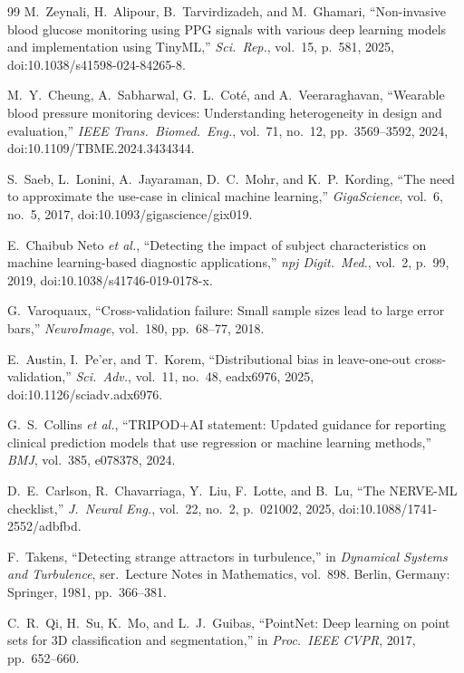\documentclass[journal]{IEEEtran}
\begin{document}
\begin{thebibliography}{99}
M.~Zeynali, H.~Alipour, B.~Tarvirdizadeh, and M.~Ghamari, ``Non-invasive
blood glucose monitoring using PPG signals with various deep learning models
and implementation using TinyML,'' \emph{Sci.\ Rep.}, vol.~15, p.~581, 2025,
doi:10.1038/s41598-024-84265-8.

M.~Y.~Cheung, A.~Sabharwal, G.~L.~Cot\'e, and A.~Veeraraghavan, ``Wearable
blood pressure monitoring devices: Understanding heterogeneity in design and
evaluation,'' \emph{IEEE Trans.\ Biomed.\ Eng.}, vol.~71,
no.~12, pp.~3569--3592, 2024, doi:10.1109/TBME.2024.3434344.

S.~Saeb, L.~Lonini, A.~Jayaraman, D.~C.~Mohr, and K.~P.~Kording, ``The need
to approximate the use-case in clinical machine learning,''
\emph{GigaScience}, vol.~6, no.~5, 2017, doi:10.1093/gigascience/gix019.

E.~Chaibub Neto \emph{et al.}, ``Detecting the impact of subject
characteristics on machine learning-based diagnostic applications,''
\emph{npj Digit.\ Med.}, vol.~2, p.~99, 2019, doi:10.1038/s41746-019-0178-x.

G.~Varoquaux, ``Cross-validation failure: Small sample sizes lead to large
error bars,'' \emph{NeuroImage}, vol.~180, pp.~68--77, 2018.

E.~Austin, I.~Pe'er, and T.~Korem, ``Distributional bias in leave-one-out
cross-validation,'' \emph{Sci.\ Adv.}, vol.~11, no.~48, eadx6976, 2025,
doi:10.1126/sciadv.adx6976.

G.~S.~Collins \emph{et al.}, ``TRIPOD+AI statement: Updated guidance for
reporting clinical prediction models that use regression or machine
learning methods,'' \emph{BMJ}, vol.~385, e078378, 2024.

D.~E.~Carlson, R.~Chavarriaga, Y.~Liu, F.~Lotte, and B.~Lu, ``The NERVE-ML
checklist,'' \emph{J.\ Neural Eng.}, vol.~22, no.~2, p.~021002, 2025,
doi:10.1088/1741-2552/adbfbd.

F.~Takens, ``Detecting strange attractors in turbulence,'' in
\emph{Dynamical Systems and Turbulence}, ser.\ Lecture Notes in Mathematics,
vol.~898.  Berlin, Germany: Springer, 1981, pp.~366--381.

C.~R.~Qi, H.~Su, K.~Mo, and L.~J.~Guibas, ``PointNet: Deep learning on point
sets for 3D classification and segmentation,'' in \emph{Proc.\ IEEE CVPR},
2017, pp.~652--660.


\end{thebibliography}
\end{document}
